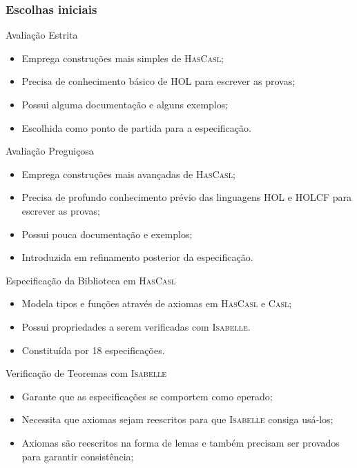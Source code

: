 \documentclass{beamer}
\newcommand{\HasCASL}{\textsc{HasCasl}\xspace}
\newcommand{\CASL}{\textsc{Casl}\xspace}
\newcommand{\HOL}{\textsc{HOL}\xspace}
\newcommand{\Isabelle}{\textsc{Isabelle}\xspace}
\newcommand{\HOLCF}{\textsc{HOLCF}\xspace}
\begin{document}
\begin{frame}
	\frametitle{Escolhas iniciais}
	
	\begin{block}{Avaliação Estrita}
	\begin{itemize}
		\item Emprega construções mais simples de \HasCASL;
		\item Precisa de conhecimento básico de \HOL para escrever as provas;
		\item Possui alguma documentação e alguns exemplos;
		\item Escolhida como ponto de partida para a especificação.
	\end{itemize}
	\end{block}
	
	\begin{block}{Avaliação Preguiçosa}
	\begin{itemize}
		\item Emprega construções mais avançadas de \HasCASL;
		\item Precisa de profundo conhecimento prévio das linguagens \HOL e \HOLCF para escrever as provas;
		\item Possui pouca documentação e exemplos;
		\item Introduzida em refinamento posterior da especificação.
	\end{itemize}
	\end{block}
\end{frame}

\begin{frame}
	\begin{block}{Especificação da Biblioteca em \HasCASL}
	\begin{itemize}
		\item Modela tipos e funções através de axiomas em \HasCASL e \CASL;
		\item Possui propriedades a serem verificadas com \Isabelle.
		\item Constituída por 18 especificações.
	\end{itemize}
	\end{block}
\end{frame}

\begin{frame}
	\begin{block}{Verificação de Teoremas com \Isabelle}
	\begin{itemize}
		\item Garante que as especificações se comportem como eperado;
		\item Necessita que axiomas sejam reescritos para que \Isabelle consiga usá-los;
		\item Axiomas são reescritos na forma de lemas e também precisam ser provados para garantir consistência;
	\end{itemize}
	\end{block}
\end{frame}
\end{document}
